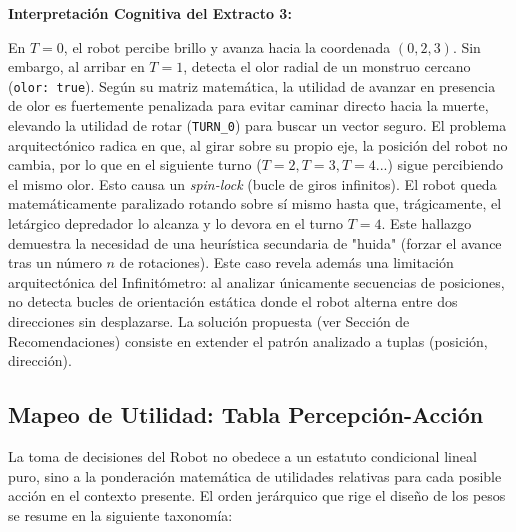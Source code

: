 \documentclass[conference]{IEEEtran}
\begin{document}
\textbf{Interpretación Cognitiva del Extracto 3:}

En $T=0$, el robot percibe brillo y avanza hacia la coordenada $(0,2,3)$. Sin embargo, al arribar en $T=1$, detecta el olor radial de un monstruo cercano (\texttt{olor: true}). Según su matriz matemática, la utilidad de avanzar en presencia de olor es fuertemente penalizada para evitar caminar directo hacia la muerte, elevando la utilidad de rotar (\texttt{TURN\_0}) para buscar un vector seguro. 
El problema arquitectónico radica en que, al girar sobre su propio eje, la posición del robot no cambia, por lo que en el siguiente turno ($T=2, T=3, T=4...$) sigue percibiendo el mismo olor. Esto causa un \textit{spin-lock} (bucle de giros infinitos). El robot queda matemáticamente paralizado rotando sobre sí mismo hasta que, trágicamente, el letárgico depredador lo alcanza y lo devora en el turno $T=4$. Este hallazgo demuestra la necesidad de una heurística secundaria de "huida" (forzar el avance tras un número $n$ de rotaciones). Este caso revela además una limitación arquitectónica del Infinitómetro: al analizar únicamente secuencias de posiciones, no detecta bucles de orientación estática donde el robot alterna entre dos direcciones sin desplazarse. La solución propuesta (ver Sección de Recomendaciones) consiste en extender el patrón analizado a tuplas (posición, dirección).

\subsection{Mapeo de Utilidad: Tabla Percepción-Acción}
La toma de decisiones del Robot no obedece a un estatuto condicional lineal puro, sino a la ponderación matemática de utilidades relativas para cada posible acción en el contexto presente. El orden jerárquico que rige el diseño de los pesos se resume en la siguiente taxonomía:
\end{document}
